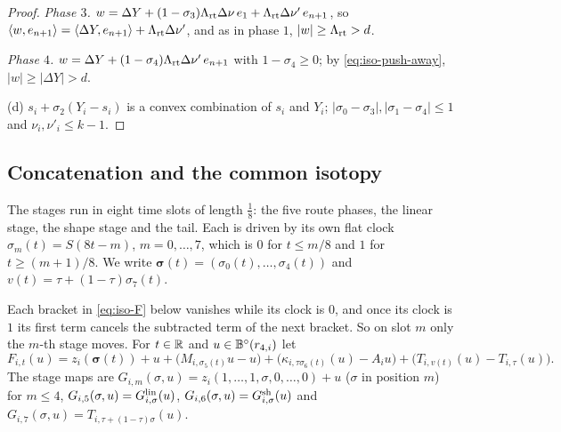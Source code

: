 \begin{proof}
\emph{Phase $3$.} $w=\Delta Y+(1-\sigma_3)\Lambda_{\rm rt}\Delta\nu\,e_1+\Lambda_{\rm rt}\Delta\nu'\,e_{n+1}$, so
$\langle w,e_{n+1}\rangle=\langle\Delta Y,e_{n+1}\rangle+\Lambda_{\rm rt}\Delta\nu'$, and as in phase $1$, $|w|\ge\Lambda_{\rm rt}>d$.

\emph{Phase $4$.} $w=\Delta Y+(1-\sigma_4)\Lambda_{\rm rt}\Delta\nu'\,e_{n+1}$ with $1-\sigma_4\ge0$; by \eqref{eq:iso-push-away},
$|w|\ge|\Delta Y|>d$.

(d) $s_i+\sigma_2(Y_i-s_i)$ is a convex combination of $s_i$ and $Y_i$; $|\sigma_0-\sigma_3|,|\sigma_1-\sigma_4|\le1$ and
$\nu_i,\nu'_i\le k-1$.
\end{proof}

\subsection{Concatenation and the common isotopy}\label{sec:iso-concat}

The stages run in eight time slots of length $\frac18$: the five route phases, the linear stage, the shape stage and the tail.
Each is driven by its own flat clock $\sigma_m(t)=S(8t-m)$, $m=0,\dots,7$, which is $0$ for $t\le m/8$ and $1$ for
$t\ge(m+1)/8$. We write $\boldsymbol\sigma(t)=(\sigma_0(t),\dots,\sigma_4(t))$ and $v(t)=\tau+(1-\tau)\sigma_7(t)$.

\begin{construction}\label{cons:iso-isotopy}
Each bracket in \eqref{eq:iso-F} below vanishes while its clock is $0$, and once its clock is $1$ its first term cancels the
subtracted term of the next bracket. So on slot $m$ only the $m$-th stage moves. For $t\in\mathbb{R}$ and $u\in\mathbb{B}^\circ(r_{4,i})$ let
\begin{equation}\label{eq:iso-F}
 F_{i,t}(u)=z_i(\boldsymbol\sigma(t))+u+\big(M_{i,\sigma_5(t)}u-u\big)+\big(\kappa_{i,\tau\sigma_6(t)}(u)-A_iu\big)
 +\big(T_{i,v(t)}(u)-T_{i,\tau}(u)\big).
\end{equation}
The stage maps are $G_{i,m}(\sigma,u)=z_i(1,\dots,1,\sigma,0,\dots,0)+u$ ($\sigma$ in position $m$) for $m\le4$,
$G_{i,5}(\sigma,u)=G^{\rm lin}_{i,\sigma}(u)$, $G_{i,6}(\sigma,u)=G^{\rm sh}_{i,\sigma}(u)$ and
$G_{i,7}(\sigma,u)=T_{i,\tau+(1-\tau)\sigma}(u)$.
\end{construction}

